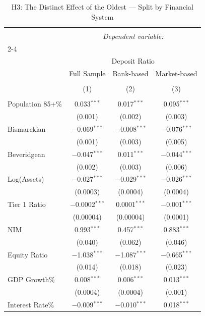 
\begin{table}[!htbp] \centering 
  \caption{H3: The Distinct Effect of the Oldest --- Split by Financial System} 
  \label{} 
\begin{tabular}{@{\extracolsep{5pt}}lccc} 
\\[-1.8ex]\hline 
\hline \\[-1.8ex] 
 & \multicolumn{3}{c}{\textit{Dependent variable:}} \\ 
\cline{2-4} 
\\[-1.8ex] & \multicolumn{3}{c}{Deposit Ratio} \\ 
 & Full Sample & Bank-based & Market-based \\ 
\\[-1.8ex] & (1) & (2) & (3)\\ 
\hline \\[-1.8ex] 
 Population 85+\% & 0.033$^{***}$ & 0.017$^{***}$ & 0.095$^{***}$ \\ 
  & (0.001) & (0.002) & (0.003) \\ 
  Bismarckian & $-$0.069$^{***}$ & $-$0.008$^{***}$ & $-$0.076$^{***}$ \\ 
  & (0.001) & (0.003) & (0.005) \\ 
  Beveridgean & $-$0.047$^{***}$ & 0.011$^{***}$ & $-$0.044$^{***}$ \\ 
  & (0.002) & (0.003) & (0.006) \\ 
  Log(Assets) & $-$0.027$^{***}$ & $-$0.029$^{***}$ & $-$0.026$^{***}$ \\ 
  & (0.0003) & (0.0004) & (0.0004) \\ 
  Tier 1 Ratio & $-$0.0002$^{***}$ & 0.0001$^{***}$ & $-$0.001$^{***}$ \\ 
  & (0.00004) & (0.00004) & (0.0001) \\ 
  NIM & 0.993$^{***}$ & 0.457$^{***}$ & 0.883$^{***}$ \\ 
  & (0.040) & (0.062) & (0.046) \\ 
  Equity Ratio & $-$1.038$^{***}$ & $-$1.087$^{***}$ & $-$0.665$^{***}$ \\ 
  & (0.014) & (0.018) & (0.023) \\ 
  GDP Growth\% & 0.008$^{***}$ & 0.006$^{***}$ & 0.013$^{***}$ \\ 
  & (0.0004) & (0.0004) & (0.001) \\ 
  Interest Rate\% & $-$0.009$^{***}$ & $-$0.010$^{***}$ & 0.018$^{***}$ \\ 

\end{tabular}
\end{table}
